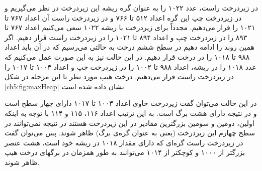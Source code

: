 در زیردرخت راست، عدد ۱۰۲۲ را به عنوان گره ریشه این زیردرخت در نظر می‌گیریم  و در زیردرخت چپ این گره اعداد ۵۱۲ تا ۷۶۶ و در زیردرخت راست آن اعداد ۷۶۷ تا ۱۰۲۱ را قرار می‌دهیم. مجدداً برای زیردرخت با ریشه ۱۰۲۲ سعی می‌کنیم اعداد ۷۶۷ تا ۸۹۳ را در زیردرخت چپ و اعداد ۸۹۴ تا ۱۰۲۱ را در زیردرخت راست قرار دهیم.  اگر همین روند را ادامه دهیم در سطح ششم درخت به حالتی می‌رسیم که در آن باید اعداد ۹۸۸ تا ۱۰۱۸ را در درخت قرار دهیم. در این حالت نیز به این صورت عمل می‌کنیم که عدد ۱۰۱۸ را در ریشه، اعداد ۹۸۸ تا ۱۰۰۲ را در زیردرخت چپ و اعداد ۱۰۰۳ تا ۱۰۱۷ را در زیردرخت راست قرار می‌دهیم. درخت هیپ مورد نظر تا این مرحله در شکل {\eqref{ch5:fig:maxHeap}} نشان داده شده است.

در این حالت می‌توان گفت زیردرخت حاوی اعداد ۱۰۰۳ تا ۱۰۱۷ دارای چهار سطح است و در نتیجه دارای هشت برگ است. به این ترتیب اعداد ۱۱۶، ۱۱۵ و ۱۱۴ با توجه به اینکه اولین، دومین و سومین بزرگترین مقادیر در این زیردرخت هستند در نتیجه نمی‌توانند در سطح چهارم این زیردرخت (یعنی به عنوان گره‌ی برگ) ظاهر شوند. پس می‌توان گفت در زیردرخت راست گره‌ای که دارای مقدار ۱۰۱۸ در ریشه خود است، هشت عنصر بزرگتر از ۱۰۰۰ و کوچکتر از ۱۰۱۴ می‌توانند به طور همزمان در برگهای درخت هیپ ظاهر شوند. 

